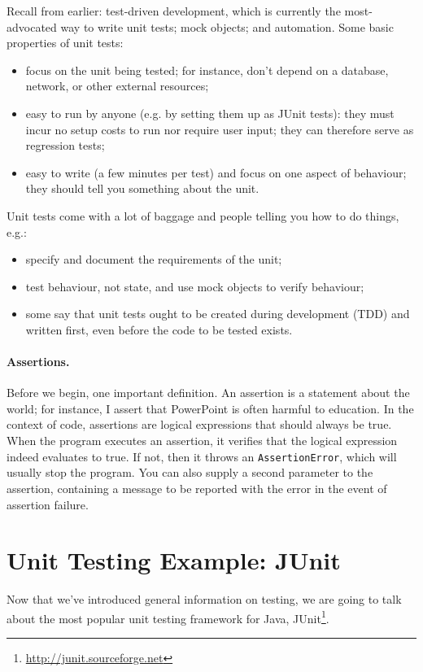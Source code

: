 Recall from earlier: test-driven
development, which is currently the
most-advocated way to write unit tests; mock objects; and automation.  Some basic properties of unit tests:
\begin{itemize}
\item focus on the unit being tested; for instance, don't depend on a database, network, or other external resources;
\item easy to run by anyone (e.g. by setting them up as JUnit tests): they must incur no setup costs to run nor require user input; they can therefore serve as regression tests;
\item easy to write (a few minutes per test) and focus on one aspect of behaviour; they should tell you something about the unit.
\end{itemize}

Unit tests come with a lot of baggage and people telling you how to do
things, e.g.:

\begin{itemize}
\item specify and document the requirements of the unit;
\item test behaviour, not state, and use mock objects to verify behaviour;
\item some say that unit tests ought to be created during development (TDD) and written first, even before the code to be tested exists.
\end{itemize}

\paragraph{Assertions.} Before we begin, one important definition. An assertion is a statement about the world;
for instance, I assert that PowerPoint is often harmful to education.
In the context of code, assertions are logical expressions that should
always be true. When the program executes an assertion, it verifies
that the logical expression indeed evaluates to true.  If not, then it
throws an {\tt AssertionError}, which will usually stop the
program. You can also supply a second parameter to the assertion,
containing a message to be reported with the error in the event of
assertion failure.

\section*{Unit Testing Example: JUnit}
Now that we've introduced general information on testing, we are going
to talk about the most popular unit testing framework for Java,
JUnit\footnote{\url{http://junit.sourceforge.net}}.

